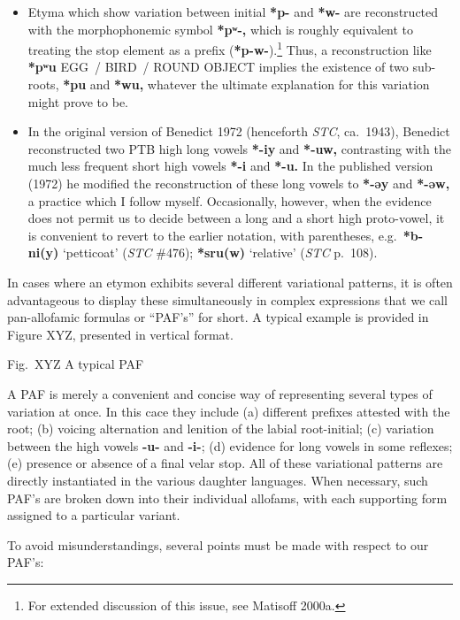 \begin{itemize}
\item Etyma which show variation between initial \textbf{*p-} and \textbf{*w-} are reconstructed with
the morphophonemic symbol \textbf{*pʷ-,} which is roughly equivalent to treating the stop
element as a prefix (\textbf{*p-w-}).\footnote{For extended discussion of this issue,
see Matisoff 2000a.} Thus, a reconstruction like \textbf{*pʷu} EGG~/ BIRD~/ ROUND OBJECT
implies the existence of two sub-roots, \textbf{*pu} and \textbf{*wu,} whatever the ultimate
explanation for this variation might prove to be.

\item In the original version of Benedict 1972 (henceforth \textit{STC}, ca.~1943), Benedict reconstructed two PTB high
long vowels \textbf{*-iy} and \textbf{*-uw,} contrasting with the much less frequent short high
vowels \textbf{*-i} and \textbf{*-u.}  In the published version (1972) he modified the
reconstruction of these long vowels to \textbf{*-əy} and \textbf{*-əw,} a practice which I follow
myself. Occasionally, however, when the evidence does not permit us to decide
between a long and a short high proto-vowel, it is convenient to revert to the
earlier notation, with parentheses, e.g.\ \textbf{*b-ni(y)} ‘petticoat’ (\textit{STC} \#476);
\textbf{*sru(w)} ‘relative’ (\textit{STC} p.~108).
\end{itemize}

In cases where an etymon exhibits several different variational patterns, it is often advantageous to display these simultaneously in complex expressions that we call pan-allofamic formulas or “PAF’s” for short. A typical example is provided in Figure XYZ, presented in vertical format.

						
				Fig.~XYZ A typical PAF

A PAF is merely a convenient and concise way of representing several types of variation at once. In this cace they include (a) different prefixes attested with the root; (b) voicing alternation and lenition of the labial root-initial; (c) variation between the high vowels \textbf{-u-} and \textbf{-i-}; (d) evidence for long vowels in some reflexes; (e) presence or absence of a final velar stop. All of these variational patterns are directly instantiated in the various daughter languages. When necessary, such PAF’s are broken down into their individual allofams, with each supporting form assigned to a particular variant.

To avoid misunderstandings, several points must be made with respect to our PAF’s:

